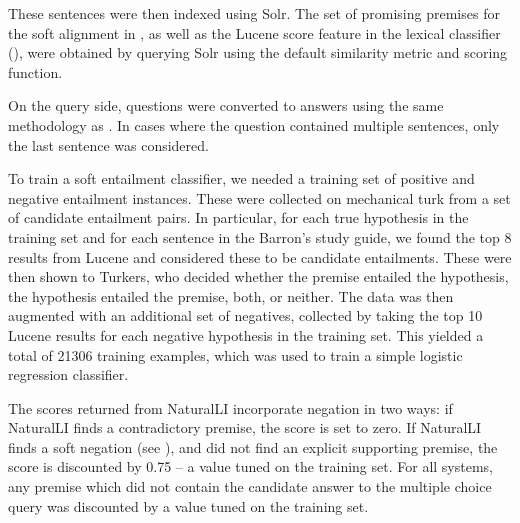 These sentences were then indexed using Solr.
The set of promising premises for the soft alignment in , as well as
  the Lucene score feature in the lexical classifier (),
  were obtained by querying Solr using the default similarity metric and scoring function.

On the query side, questions were converted to answers using the same methodology as
  .
In cases where the question contained multiple sentences, only the last sentence
  was considered.

%
%
To train a soft entailment classifier, we needed a training set of positive
  and negative entailment instances.
These were collected on mechanical turk from a set of candidate entailment pairs.
In particular, for each true hypothesis in the training set and for each sentence
  in the Barron's study guide, we found the top 8 results from Lucene and considered
  these to be candidate entailments.
These were then shown to Turkers, who decided whether the premise entailed the
  hypothesis, the hypothesis entailed the premise, both, or neither.
The data was then augmented with an additional set of negatives, collected by taking
  the top 10 Lucene results for each negative hypothesis in the training set.
This yielded a total of \num{21306} training examples, which was used to train
  a simple logistic regression classifier.

The scores returned from NaturalLI incorporate negation in two ways:
  if NaturalLI finds a contradictory premise, the score is set to zero.
If NaturalLI finds a soft negation (see ),
  and did not find an explicit supporting premise, the score is discounted
  by 0.75 -- a value tuned on the training set.
For all systems, any premise which did not contain the candidate answer to the
  multiple choice query was discounted by a value tuned on the training
  set.


